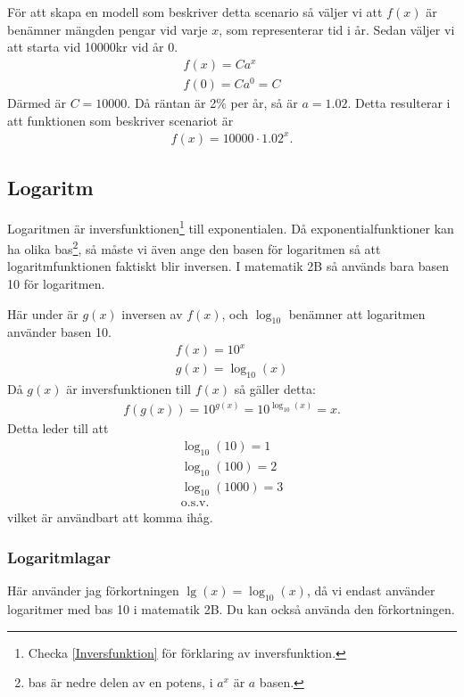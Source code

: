 För att skapa en modell som beskriver detta scenario så väljer vi att $f(x)$ är benämner mängden pengar vid varje $x$, som representerar tid i år. Sedan väljer vi att starta vid 10000kr vid år 0.
\begin{align}
	f(x)=Ca^x \\
	f(0)=Ca^0 = C
\end{align}
Därmed är $C = 10000$. Då räntan är 2\% per år, så är $a=1.02$. Detta resulterar i att funktionen som beskriver scenariot är
\begin{align}
	f(x)=10000\cdot1.02^x.
\end{align}

\newpage
\subsection{Logaritm}

Logaritmen är inversfunktionen\footnote{Checka \ref{Inversfunktion} för förklaring av inversfunktion.} till exponentialen. Då exponentialfunktioner kan ha olika bas\footnote{bas är nedre delen av en potens, i $a^x$ är $a$ basen.}, så måste vi även ange den basen för logaritmen så att logaritmfunktionen faktiskt blir inversen. I matematik 2B så används bara basen 10 för logaritmen.

Här under är $g(x)$ inversen av $f(x)$, och $\log_{10}$ benämner att logaritmen använder basen 10.
\begin{align}
	f(x) = 10^x \\
	g(x) = \log_{10}(x)
\end{align}
Då $g(x)$ är inversfunktionen till $f(x)$ så gäller detta:
\begin{align}
	f(g(x)) = 10^{g(x)} = 10^{\log_{10}(x)} = x.
\end{align}
Detta leder till att
\begin{align}
	\log_{10}(10) = 1 \\
	\log_{10}(100) = 2 \\
	\log_{10}(1000) = 3 \\
	\text{o.s.v.}
\end{align}
vilket är användbart att komma ihåg.

\newpage
\subsubsection{Logaritmlagar}

Här använder jag förkortningen $\lg(x) = \log_{10}(x)$, då vi endast använder logaritmer med bas 10 i matematik 2B. Du kan också använda den förkortningen.

